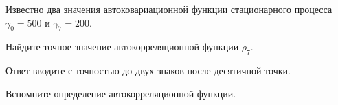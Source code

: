 
\begin{question}
Известно два значения автоковариационной функции стационарного процесса \(\gamma_0 = 500\) и \(\gamma_7 = 200\).

Найдите точное значение автокорреляционной функции \(\rho_7\).

Ответ вводите с точностью до двух знаков после десятичной точки.
\end{question}

\begin{solution}
Вспомните определение автокорреляционной функции.
\end{solution}

